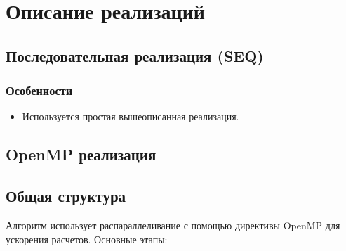 \documentclass[12pt]{article}
\begin{document}
\section{Описание реализаций}

\subsection{Последовательная реализация (SEQ)}
\subsubsection*{Особенности}
\begin{itemize}
  \item Используется простая вышеописанная реализация.
\end{itemize}

\subsection{OpenMP реализация}
\subsection*{Общая структура}
Алгоритм использует распараллеливание с помощью директивы OpenMP для ускорения расчетов. Основные этапы:
\end{document}
